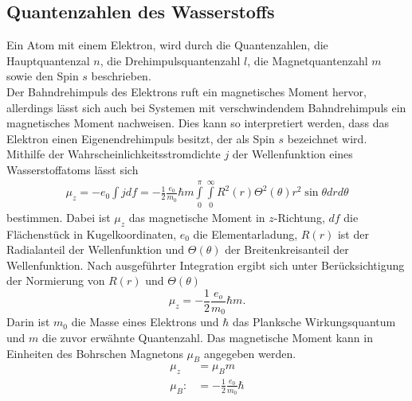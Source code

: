 \subsection{Quantenzahlen des Wasserstoffs}
Ein Atom mit einem Elektron, wird durch die Quantenzahlen, die Hauptquantenzal $n$, die Drehimpulsquantenzahl $l$, die Magnetquantenzahl $m$ sowie den Spin $s$ beschrieben.\\
Der Bahndrehimpuls des Elektrons ruft ein magnetisches Moment hervor, allerdings lässt sich auch bei Systemen mit verschwindendem Bahndrehimpuls ein magnetisches Moment nachweisen. 
Dies kann so interpretiert werden, dass das Elektron einen Eigenendrehimpuls besitzt, 
der als Spin $s$ bezeichnet wird.\\
Mithilfe der Wahrscheinlichkeitsstromdichte $j$ der Wellenfunktion eines Wasserstoffatoms lässt sich
\begin{align}
	\mu_z=-e_0\int j df=-\frac{1}{2}\frac{e_0}{m_0}\hbar m \int\limits_{0}^{\pi}\int\limits_{0}^{\infty} R^2(r)\Theta^2(\theta)r^2\sin\theta drd\theta
\end{align}
bestimmen. 
Dabei ist $\mu_z$ das magnetische Moment in $z$-Richtung, $df$ die Flächenstück in Kugelkoordinaten, $e_0$ die Elementarladung, $R(r)$ ist der Radialanteil der Wellenfunktion und $\Theta(\theta)$ der Breitenkreisanteil der Wellenfunktion.
Nach ausgeführter Integration ergibt sich unter Berücksichtigung der Normierung von $R(r)$ und $\Theta(\theta)$  
\begin{equation}
	\mu_z=-\frac{1}{2}\frac{e_o}{m_0}\hbar m.
\end{equation}
Darin ist $m_0$ die Masse eines Elektrons und $\hbar$ das Planksche Wirkungsquantum und $m$ die zuvor erwähnte Quantenzahl. 
Das magnetische Moment kann in Einheiten des Bohrschen Magnetons $\mu_B$ angegeben werden.
\begin{align}
	\mu_z &= \mu_B m\\
	\mu_B:&=-\frac{1}{2}\frac{e_0}{m_0}\hbar
\end{align}
